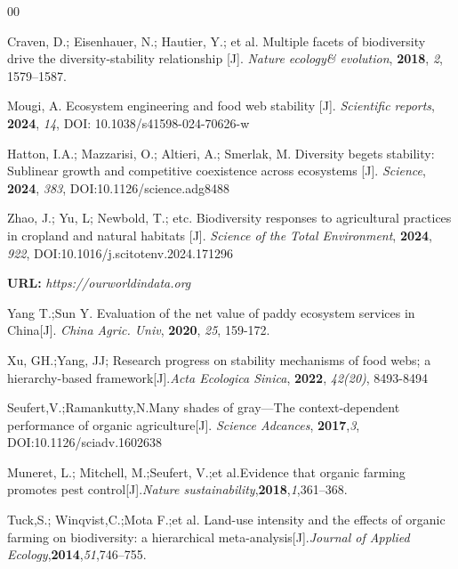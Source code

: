\documentclass[12pt]{article}
\begin{document}

\newpage
\begin{thebibliography}{00}
	
Craven, D.; Eisenhauer, N.; Hautier, Y.; et al. Multiple facets of biodiversity drive the diversity-stability relationship [J]. \emph{Nature ecology\& evolution}, \textbf{2018}, \emph{2}, 1579--1587.
		
Mougi, A. Ecosystem engineering and food web stability [J]. \emph{Scientific reports}, \textbf{2024}, \emph{14}, DOI: 10.1038/s41598-024-70626-w 
		
		
Hatton, I.A.; Mazzarisi, O.; Altieri, A.; Smerlak, M. Diversity begets stability: Sublinear growth and competitive coexistence across ecosystems [J]. \emph{Science}, \textbf{2024}, \emph{383}, DOI:10.1126/science.adg8488


Zhao, J.; Yu, L; Newbold, T.; etc. Biodiversity responses to agricultural practices in cropland and natural habitats [J]. \emph{Science of the Total Environment}, \textbf{2024}, \emph{922}, DOI:10.1016/j.scitotenv.2024.171296

\textbf{URL: }\textit{https://ourworldindata.org}

Yang T.;Sun Y. Evaluation of the net value of paddy ecosystem services in China[J]. \emph{China Agric. Univ},  \textbf{2020},  \emph{25}, 159-172.

Xu, GH.;Yang, JJ; Research progress on stability mechanisms of food webs; a hierarchy-based framework[J].\emph{Acta Ecologica Sinica}, \textbf{2022}, \emph{42(20)}, 8493-8494 

Seufert,V.;Ramankutty,N.Many shades of gray—The context-dependent performance of organic agriculture[J]. \emph{Science Adcances}, \textbf{2017},\emph{3}, DOI:10.1126/sciadv.1602638

Muneret, L.; Mitchell, M.;Seufert, V.;et al.Evidence that organic farming promotes pest control[J].\emph{Nature sustainability},\textbf{2018},\emph{1},361–368.

Tuck,S.; Winqvist,C.;Mota F.;et al. Land-use intensity and the effects of organic farming on biodiversity: a hierarchical meta-analysis[J].\emph{Journal of Applied Ecology},\textbf{2014},\emph{51},746–755.



\end{thebibliography}
\end{document}
